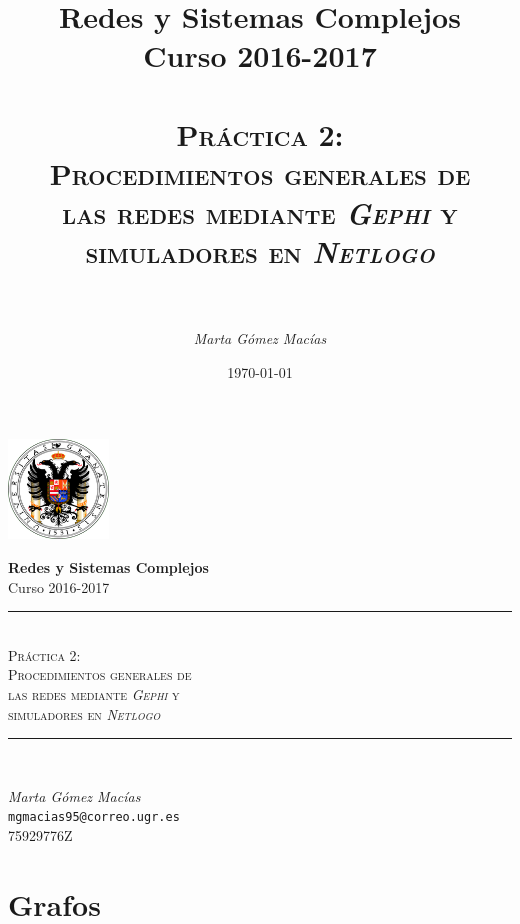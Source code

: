 \documentclass[10pt,a4paper,spanish]{article}
\title{
\normalfont \normalsize 
{\bf Redes y Sistemas Complejos} \\ Curso 2016-2017 \\ [25pt] %
\horrule{0.5pt} \\[0.4cm] %
\huge \textsc{Práctica 2: \\ Procedimientos generales de \\ las redes mediante \textit{Gephi} y \\ simuladores en \textit{Netlogo}} \\ %
\horrule{2pt} \\[0.5cm] %
}
\author{\textit{Marta Gómez Macías}} %
\numberwithin{equation}{section} %
\numberwithin{figure}{section} %
\numberwithin{table}{section} %
\theoremstyle{plain}
\theoremstyle{definition}
\newcommand{\horrule}[1]{\rule{\linewidth}{#1}} %
\begin{document}
\renewcommand{\listtablename}{Índice de tablas}
\renewcommand{\tablename}{Tabla}

\begin{titlepage}
\begin{center}
\includegraphics[width=0.2\textwidth]{../../ugr}

\normalfont \normalsize 
{\bf Redes y Sistemas Complejos} \\ Curso 2016-2017 \\ [25pt] %
\horrule{0.5pt} \\[0.4cm] %
{\huge \textsc{Práctica 2: \\ Procedimientos generales de \\ las redes mediante \textit{Gephi} y \\ simuladores en \textit{Netlogo}}} %
\horrule{2pt} \\[0.5cm] %

{\Large \textit{Marta Gómez Macías} \\ \texttt{mgmacias95@correo.ugr.es} \\ 75929776Z \\[0.5cm]

\date{\today}} %
\end{center}
\end{titlepage}

\tableofcontents %
\newpage

\setcounter{section}{1}
\section{Grafos}
\end{document}
